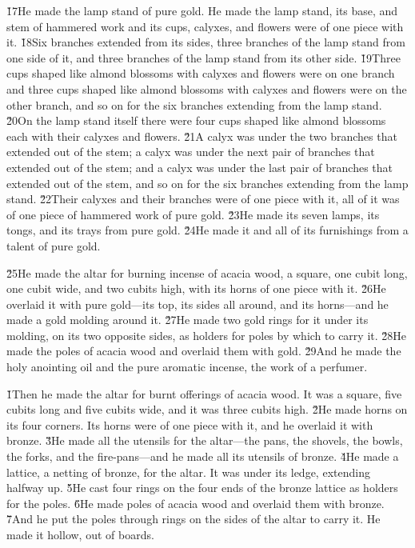\v{17}He made the lamp stand of pure gold. He made the lamp stand, its base, and stem of hammered work and its cups, calyxes, and flowers were of one piece with it. \v{18}Six branches extended from its sides, three branches of the lamp stand from one side of it, and three branches of the lamp stand from its other side. \v{19}Three cups shaped like almond blossoms with calyxes and flowers were on one branch and three cups shaped like almond blossoms with calyxes and flowers were on the other branch, and so on for the six branches extending from the lamp stand. \v{20}On the lamp stand itself there were four cups shaped like almond blossoms each with their calyxes and flowers. \v{21}A calyx was under the two branches that extended out of the stem; a calyx was under the next pair of branches that extended out of the stem; and a calyx was under the last pair of branches that extended out of the stem, and so on for the six branches extending from the lamp stand. \v{22}Their calyxes and their branches were of one piece with it, all of it was of one piece of hammered work of pure gold. \v{23}He made its seven lamps, its tongs, and its trays from pure gold. \v{24}He made it and all of its furnishings from a talent of pure gold.

\v{25}He made the altar for burning incense of acacia wood, a square, one cubit long, one cubit wide, and two cubits high, with its horns of one piece with it. \v{26}He overlaid it with pure gold---its top, its sides all around, and its horns---and he made a gold molding around it. \v{27}He made two gold rings for it under its molding, on its two opposite sides, as holders for poles by which to carry it. \v{28}He made the poles of acacia wood and overlaid them with gold. \v{29}And he made the holy anointing oil and the pure aromatic incense, the work of a perfumer.

\v{1}Then he made the altar for burnt offerings of acacia wood. It was a square, five cubits long and five cubits wide, and it was three cubits high. \v{2}He made horns on its four corners. Its horns were of one piece with it, and he overlaid it with bronze. \v{3}He made all the utensils for the altar---the pans, the shovels, the bowls, the forks, and the fire-pans---and he made all its utensils of bronze. \v{4}He made a lattice, a netting of bronze, for the altar. It was under its ledge, extending halfway up. \v{5}He cast four rings on the four ends of the bronze lattice as holders for the poles. \v{6}He made poles of acacia wood and overlaid them with bronze. \v{7}And he put the poles through rings on the sides of the altar to carry it. He made it hollow, out of boards.

